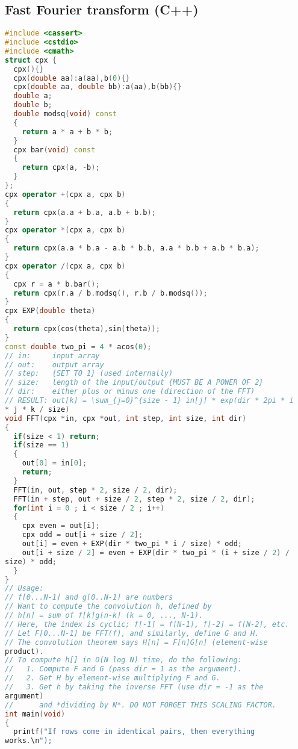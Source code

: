 \subsection{Fast Fourier transform (C++)}
\begin{lstlisting}[language=C++]
#include <cassert>
#include <cstdio>
#include <cmath>
struct cpx {
  cpx(){}
  cpx(double aa):a(aa),b(0){}
  cpx(double aa, double bb):a(aa),b(bb){}
  double a;
  double b;
  double modsq(void) const
  {
    return a * a + b * b;
  }
  cpx bar(void) const
  {
    return cpx(a, -b);
  }
};
cpx operator +(cpx a, cpx b)
{
  return cpx(a.a + b.a, a.b + b.b);
}
cpx operator *(cpx a, cpx b)
{
  return cpx(a.a * b.a - a.b * b.b, a.a * b.b + a.b * b.a);
}
cpx operator /(cpx a, cpx b)
{
  cpx r = a * b.bar();
  return cpx(r.a / b.modsq(), r.b / b.modsq());
}
cpx EXP(double theta)
{
  return cpx(cos(theta),sin(theta));
}
const double two_pi = 4 * acos(0);
// in:     input array
// out:    output array
// step:   {SET TO 1} (used internally)
// size:   length of the input/output {MUST BE A POWER OF 2}
// dir:    either plus or minus one (direction of the FFT)
// RESULT: out[k] = \sum_{j=0}^{size - 1} in[j] * exp(dir * 2pi * i 
* j * k / size)
void FFT(cpx *in, cpx *out, int step, int size, int dir)
{
  if(size < 1) return;
  if(size == 1)
  {
    out[0] = in[0];
    return;
  }
  FFT(in, out, step * 2, size / 2, dir);
  FFT(in + step, out + size / 2, step * 2, size / 2, dir);
  for(int i = 0 ; i < size / 2 ; i++)
  {
    cpx even = out[i];
    cpx odd = out[i + size / 2];
    out[i] = even + EXP(dir * two_pi * i / size) * odd;
    out[i + size / 2] = even + EXP(dir * two_pi * (i + size / 2) / 
size) * odd;
  }
}
// Usage:
// f[0...N-1] and g[0..N-1] are numbers
// Want to compute the convolution h, defined by
// h[n] = sum of f[k]g[n-k] (k = 0, ..., N-1).
// Here, the index is cyclic; f[-1] = f[N-1], f[-2] = f[N-2], etc.
// Let F[0...N-1] be FFT(f), and similarly, define G and H.
// The convolution theorem says H[n] = F[n]G[n] (element-wise 
product).
// To compute h[] in O(N log N) time, do the following:
//   1. Compute F and G (pass dir = 1 as the argument).
//   2. Get H by element-wise multiplying F and G.
//   3. Get h by taking the inverse FFT (use dir = -1 as the 
argument)
//      and *dividing by N*. DO NOT FORGET THIS SCALING FACTOR.
int main(void)
{
  printf("If rows come in identical pairs, then everything 
works.\n");
  

\end{lstlisting}
